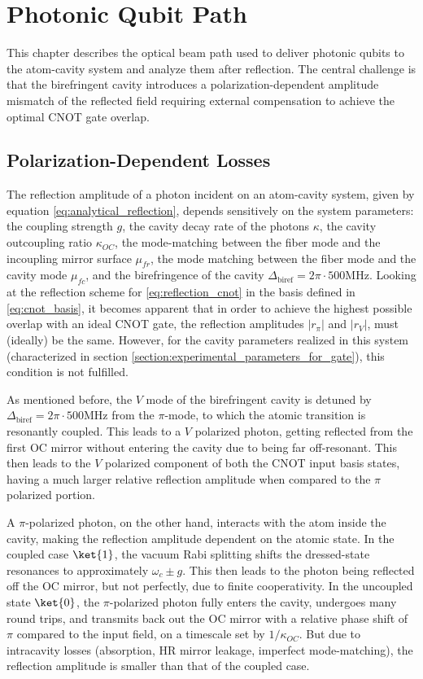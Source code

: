 \chapter{Photonic Qubit Path} \label{chapter:photonic_qubit_path}

This chapter describes the optical beam path used to deliver photonic qubits to the atom-cavity system and analyze them after reflection. The central challenge is that the birefringent cavity introduces a polarization-dependent amplitude mismatch of the reflected field requiring external compensation to achieve the optimal CNOT gate overlap.

\section{Polarization-Dependent Losses}\label{section:polarization_dependent_losses}

The reflection amplitude of a photon incident on an atom-cavity system, given by equation \eqref{eq:analytical_reflection}, depends sensitively on the system parameters: the coupling strength $g$, the cavity decay rate of the photons $\kappa$, the cavity outcoupling ratio $\kappa_{OC}$, the mode-matching between the fiber mode and the incoupling mirror surface $\mu_{fr}$, the mode matching between the fiber mode and the cavity mode $\mu_{fc}$, and the birefringence of the cavity $\Delta_{\text{biref}}=2\pi\cdot 500\text{MHz}$. Looking at the reflection scheme for \eqref{eq:reflection_cnot} in the basis defined in \eqref{eq:cnot_basis}, it becomes apparent that in order to achieve the highest possible overlap with an ideal CNOT gate, the reflection amplitudes $|r_{\pi}|$ and $|r_{V}|$, must (ideally) be the same. However, for the cavity parameters realized in this system (characterized in section \ref{section:experimental_parameters_for_gate}), this condition is not fulfilled.

As mentioned before, the $V$ mode of the birefringent cavity is detuned by $\Delta_{\text{biref}}=2\pi\cdot 500\text{MHz}$ from the $\pi$-mode, to which the atomic transition is resonantly coupled. This leads to a $V$ polarized photon, getting reflected from the first OC mirror without entering the cavity due to being far off-resonant. This then leads to the $V$ polarized component of both the CNOT input basis states, having a much larger relative reflection amplitude when compared to the $\pi$ polarized portion.

A $\pi$-polarized photon, on the other hand, interacts with the atom inside the cavity, making the reflection amplitude dependent on the atomic state. In the coupled case $\ket{1}$, the vacuum Rabi splitting shifts the dressed-state resonances to approximately $\omega_c\pm g$. This then leads to the photon being reflected off the OC mirror, but not perfectly, due to finite cooperativity. In the uncoupled state $\ket{0}$, the $\pi$-polarized photon fully enters the cavity, undergoes many round trips, and transmits back out the OC mirror with a relative phase shift of $\pi$ compared to the input field, on a timescale set by $1/\kappa_{OC}$. But due to intracavity losses (absorption, HR mirror leakage, imperfect mode-matching), the reflection amplitude is smaller than that of the coupled case.


